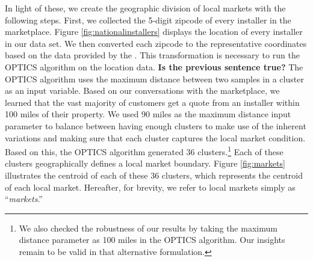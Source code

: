 \documentclass[msom,blindrev]{informs3}
\begin{document}

In light of these, we create the geographic division of local markets with the following steps. First, we collected the 5-digit zipcode of
every installer in the marketplace. Figure \ref{fig:nationalinstallers} displays the location of every installer in our data set. We then converted each zipcode  to the representative coordinates based on the data provided by the \citet{us_census_bureau_2019}. This transformation is necessary to run the OPTICS algorithm on the location data. \textbf{Is the previous sentence true?} The OPTICS algorithm uses the maximum distance between two samples in a cluster as an input variable. Based on our conversations with the marketplace, we learned that the vast majority of customers get a quote from an installer within 100 miles of their property. We used 90 miles as the maximum distance input parameter to balance between having enough clusters to make use of the inherent variations and making sure that each cluster captures the local market condition. Based on this, the OPTICS algorithm generated 36 clusters.\footnote{We also checked the robustness of our results by taking the maximum distance parameter as 100 miles in the OPTICS algorithm. Our insights remain to be valid in that alternative formulation.} Each of these clusters geographically defines a local market boundary. Figure \ref{fig:markets} illustrates the centroid of each of these 36 clusters, which represents the centroid of each local market. Hereafter, for brevity, we refer to local markets simply as ``\emph{markets}.''



\end{document}

